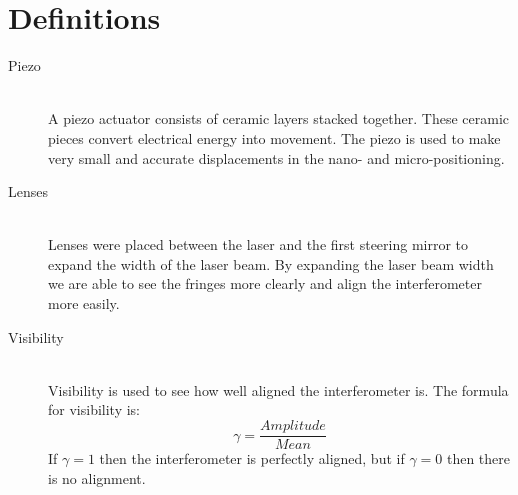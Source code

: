 \onecolumn
\section{Definitions}

\begin{description}
  \item[Piezo] \hfill \\ 
  A piezo actuator consists of ceramic layers stacked together. These ceramic
pieces convert electrical energy into movement. The piezo is used to make very
small and accurate displacements in the nano- and micro-positioning.
  \item[Lenses] \hfill \\ 
  Lenses were placed between the laser and the first steering mirror to expand
the width of the laser beam. By expanding the laser beam width we are able to
see the fringes more clearly and align the interferometer more easily.
  \item[Visibility] \hfill \\
  Visibility is used to see how well aligned the interferometer is. The formula
for visibility is:
%
     \begin{equation}\label{eqn:Visibility}  
        \gamma= \frac{Amplitude}{Mean}
     \end{equation}    
%
If $\gamma=1$ then the interferometer is perfectly aligned, but if $\gamma=0$
then there is no
alignment. 
\end{description}
